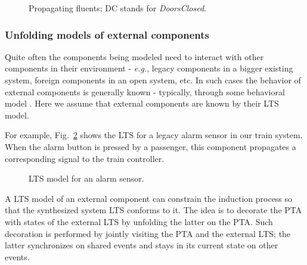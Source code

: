 \begin{figure}[H]
\centering
{}
\caption{Propagating fluents\label{Fig:fluents}; DC stands for \emph{DoorsClosed}.}
\end{figure}


\subsubsection*{Unfolding models of external components}

Quite often the components being modeled need to interact with other components in their environment - \textit{e.g.}, legacy components in a bigger existing system, foreign components in an open system, etc. In such cases the behavior of external components is generally known - typically, through some behavioral model \cite{Hall:2004}. Here we assume that external components are known by their LTS model. 

For example, Fig.~\ref{Fig.:alarm-sensor} shows the LTS for a legacy alarm sensor in our train system. When the alarm button is pressed by a passenger, this component propagates a corresponding signal to the train controller. 

\begin{figure}
\centering
{}
\caption{LTS model for an alarm sensor\label{Fig.:alarm-sensor}.}
\end{figure}

A LTS model of an external component can constrain the induction process so that the synthesized system LTS conforms to it. The idea is to decorate the PTA with states of the external LTS by unfolding the latter on the PTA. Such decoration is performed by jointly visiting the PTA and the external LTS; the latter synchronizes on shared events and stays in its current state on other events.

